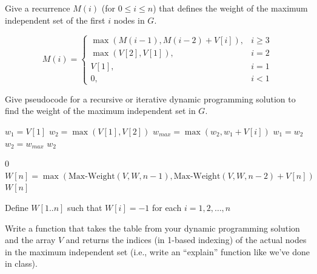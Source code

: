 \begin{questions}
	\question[3] Give a recurrence $M(i)$ (for $0 \le i \le n$) that defines the weight of the maximum independent set of the first $i$ nodes in $G$.

	\ifsolutions\fi

	\begin{soln}
		\[
			M(i) =
			\begin{cases}
				\max(M(i - 1), M(i - 2) + V[i]), & i \geq 3 \\
				\max(V[2], V[1]),                & i = 2    \\
				V[1],                            & i = 1    \\
				0,                               & i < 1
			\end{cases}
		\]
	\end{soln}

	\question[5] Give pseudocode for a recursive or iterative dynamic programming solution to find the weight of the maximum independent set in $G$.

	\ifsolutions\fi
	\begin{soln}
		\begin{algorithmic}[1]
			\State {}
			\EndIf
			\State $w_{1} = V[1]$
			\State $w_{2} = \max(V[1], V[2])$
			\State $w_{max} = \max(w_2, w_1 + V[i])$
			\State $w_1 =w_2$
			\State $w_2 = w_{max}$
			\EndFor
			\State \Return $w_2$
			\EndProcedure
		\end{algorithmic}

		\begin{algorithmic}[1]
			\State \Return $0$
			\EndIf
			\State $W[n] = \max(\text{Max-Weight}(V, W, n - 1), \text{Max-Weight}(V, W, n - 2) + V[n])$
			\EndIf
			\State \Return $W[n]$
			\EndProcedure
		\end{algorithmic}

		\begin{algorithmic}[1]
			\State Define $W[1..n]$ such that $W[i] = -1$ for each $i = 1, 2, \dots, n$
			\State {}
			\EndProcedure
		\end{algorithmic}
	\end{soln}

	\question[4] Write a function that takes the table from your dynamic programming solution and the array $V$ and returns the indices (in 1-based indexing) of the actual nodes in the maximum independent set (i.e., write an ``explain'' function like we've done in class).


\end{questions}
